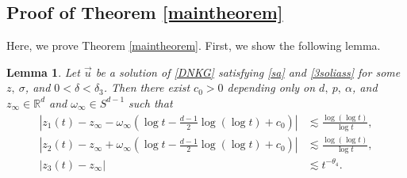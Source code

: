 \documentclass[reqno]{amsart}
\theoremstyle{plain}
\newtheorem{lemma}[theorem]{Lemma}
\theoremstyle{definition}
\numberwithin{equation}{section}
\newcommand{\1}{\mathbbm{1}}
\begin{document}
\subsection{Proof of Theorem \ref{maintheorem}}
Here, we prove Theorem \ref{maintheorem}. First, we show the following lemma.
\begin{lemma}\label{mainlemma}
Let $\vec{u}$ be a solution of \eqref{DNKG} satisfying \eqref{sa} and \eqref{3soliass} for some $z,\ \sigma$, and $0<\delta<\delta_3$. Then there exist $c_0>0$ depending only on $d,\ p,\ \alpha$, and  $z_{\infty}\in \mathbb{R}^d$ and $\omega_{\infty}\in S^{d-1}$ such that 
\begin{align}
\left|z_1(t)-z_{\infty}-\omega_{\infty}\left(\log{t}-\frac{d-1}{2}\log{(\log{t})}+c_0\right)\right|&\lesssim \frac{\log{(\log{t})}}{\log{t}}, \label{modifiedz1}
\\
\left|z_2(t)-z_{\infty}+\omega_{\infty}\left(\log{t}-\frac{d-1}{2}\log{(\log{t})}+c_0\right)\right|&\lesssim \frac{\log{(\log{t})}}{\log{t}}, \label{modifiedz2}
\\
\left|z_3(t)-z_{\infty}\right|&\lesssim t^{-\theta_4}. \label{modifiedz3}
\end{align}
\end{lemma}
\end{document}
